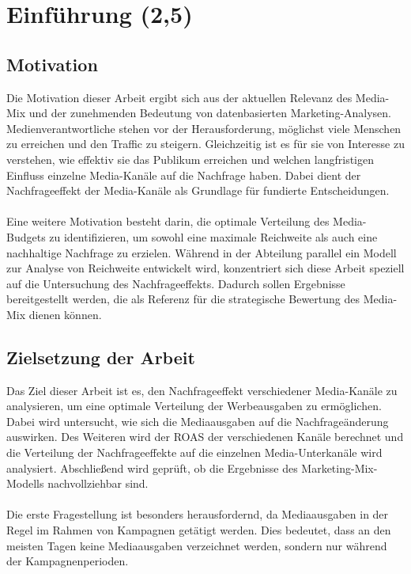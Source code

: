 
\newpage
\section{Einführung (2,5)}
\label{Einführung}
\subsection{Motivation}
Die Motivation dieser Arbeit ergibt sich aus der aktuellen Relevanz des Media-Mix und der zunehmenden Bedeutung von datenbasierten Marketing-Analysen. Medienverantwortliche stehen vor der Herausforderung, möglichst viele Menschen zu erreichen und den Traffic zu steigern. Gleichzeitig ist es für sie von Interesse zu verstehen, wie effektiv sie das Publikum erreichen und welchen langfristigen Einfluss einzelne Media-Kanäle auf die Nachfrage haben. Dabei dient der Nachfrageeffekt der Media-Kanäle als Grundlage für fundierte Entscheidungen.\\\\
Eine weitere Motivation besteht darin, die optimale Verteilung des Media-Budgets zu identifizieren, um sowohl eine maximale Reichweite als auch eine nachhaltige Nachfrage zu erzielen. Während in der Abteilung parallel ein Modell zur Analyse von Reichweite entwickelt wird, konzentriert sich diese Arbeit speziell auf die Untersuchung des Nachfrageeffekts. Dadurch sollen Ergebnisse bereitgestellt werden, die als Referenz für die strategische Bewertung des Media-Mix dienen können. \\
\subsection{Zielsetzung der Arbeit}
\label{ZielsetzungDerArbeit}
Das Ziel dieser Arbeit ist es, den Nachfrageeffekt verschiedener Media-Kanäle zu analysieren, um eine optimale Verteilung der Werbeausgaben zu ermöglichen. Dabei wird untersucht, wie sich die Mediaausgaben auf die Nachfrageänderung auswirken. Des Weiteren wird der \ac{ROAS} der verschiedenen Kanäle berechnet und die Verteilung der Nachfrageeffekte auf die einzelnen Media-Unterkanäle wird analysiert. Abschließend wird geprüft, ob die Ergebnisse des Marketing-Mix-Modells nachvollziehbar sind.\\\\
Die erste Fragestellung ist besonders herausfordernd, da Mediaausgaben in der Regel im Rahmen von Kampagnen getätigt werden. Dies bedeutet, dass an den meisten Tagen keine Mediaausgaben verzeichnet werden, sondern nur während der Kampagnenperioden. 
